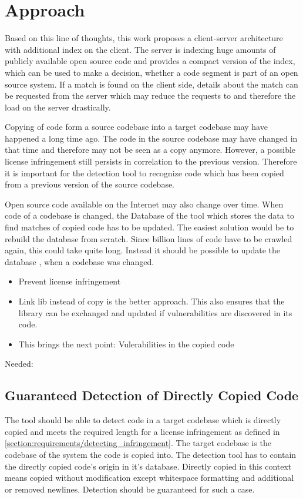 \section{Approach}
Based on this line of thoughts, this work proposes a client-server architecture with additional index on the client.
The server is indexing huge amounts of publicly available open source code and provides a compact version of the index, which can be used to make a decision, whether a code segment is part of an open source system.
If a match is found on the client side, details about the match can be requested from the server which may reduce the requests to and therefore the load on the server drastically.

Copying of code form a source codebase into a target codebase may have happened a long time ago.
The code in the source codebase may have changed in that time and therefore may not be seen as a copy anymore.
However, a possible license infringement still persists in correlation to the previous version.
Therefore it is important for the detection tool to recognize code which has been copied from a previous version of the source codebase.

Open source code available on the Internet may also change over time.
When code of a codebase is changed, the Database of the tool which stores the data to find matches of copied code has to be updated.
The easiest solution would be to rebuild the database from scratch.
Since billion lines of code have to be crawled again, this could take quite long.
Instead it should be possible to update the database , when a codebase was changed.

\begin{itemize}
	\item Prevent license infringement
	\item Link lib instead of copy is the better approach. This also ensures that the library can be exchanged and updated if vulnerabilities are discovered in its code.
	\item This brings the next point: Vulerabilities in the copied code
\end{itemize}

Needed:

\subsection{Guaranteed Detection of Directly Copied Code}\label{section:requirements/guaranteed_detection}
The tool should be able to detect code in a target codebase which is directly copied and meets the required length for a license infringement as defined in \autoref{section:requirements/detecting_infringement}.
The target codebase is the codebase of the system the code is copied into.
The detection tool has to contain the directly copied code's origin in it's database.
Directly copied in this context means copied without modification except whitespace formatting and additional or removed newlines.
Detection should be guaranteed for such a case.


